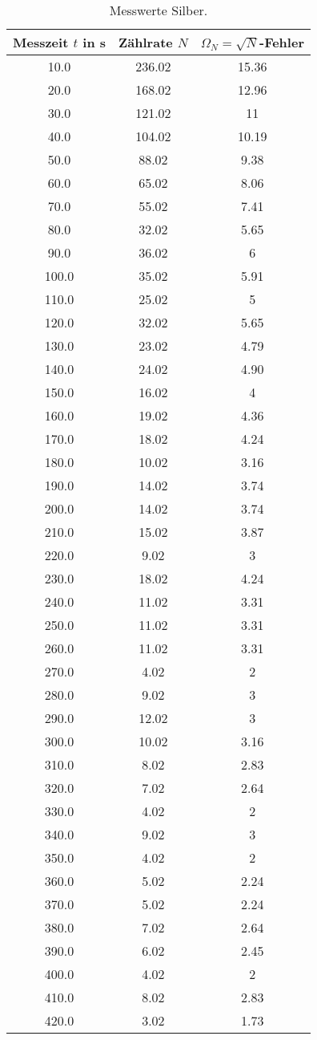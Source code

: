 \begin{table}
  \centering
  \caption{Messwerte Silber.}
  \label{tab:N2}
\begin{tabular}{c c c}
  \toprule
  Messzeit $t$ in s & Zählrate $N$ & $\Omega_N = \sqrt{N}$-Fehler\\
  \midrule
  10.0 & 236.02 & 15.36 \\
  20.0 & 168.02 & 12.96 \\
  30.0 & 121.02 & 11 \\
  40.0 & 104.02 & 10.19 \\
  50.0 & 88.02 & 9.38  \\
  60.0 & 65.02 & 8.06  \\
  70.0 & 55.02 & 7.41  \\
  80.0 & 32.02 & 5.65  \\
  90.0 & 36.02 & 6  \\
  100.0 & 35.02 & 5.91  \\
  110.0 & 25.02 & 5  \\
  120.0 & 32.02 & 5.65  \\
  130.0 & 23.02 & 4.79  \\
  140.0 & 24.02 & 4.90  \\
  150.0 & 16.02 & 4 \\
  160.0 & 19.02 & 4.36  \\
  170.0 & 18.02 & 4.24  \\
  180.0 & 10.02 & 3.16  \\
  190.0 & 14.02 & 3.74  \\
  200.0 & 14.02 & 3.74  \\
  210.0 & 15.02 & 3.87  \\
  220.0 & 9.02 & 3  \\
  230.0 & 18.02 & 4.24  \\
  240.0 & 11.02 & 3.31  \\
  250.0 & 11.02 & 3.31  \\
  260.0 & 11.02 & 3.31  \\
  270.0 & 4.02 & 2  \\
  280.0 & 9.02 & 3  \\
  290.0 & 12.02 & 3  \\
  300.0 & 10.02 & 3.16  \\
  310.0 & 8.02 & 2.83  \\
  320.0 & 7.02 & 2.64  \\
  330.0 & 4.02 & 2  \\
  340.0 & 9.02 & 3  \\
  350.0 & 4.02 & 2  \\
  360.0 & 5.02 & 2.24  \\
  370.0 & 5.02 & 2.24  \\
  380.0 & 7.02 & 2.64  \\
  390.0 & 6.02 & 2.45  \\
  400.0 & 4.02 & 2  \\
  410.0 & 8.02 & 2.83  \\
  420.0 & 3.02 & 1.73  \\
  \bottomrule
\end{tabular}
\end{table}
\FloatBarrier

